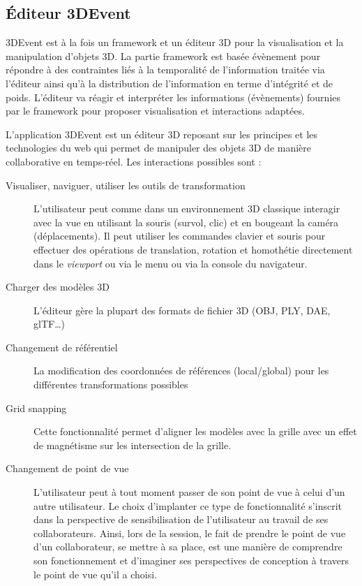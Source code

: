 \subsection{Éditeur 3DEvent}
3DEvent est à la fois un \gls{framework} et un éditeur 3D pour la visualisation et la 
manipulation d'objets 3D. La partie \gls{framework} est basée évènement pour 
répondre à des contraintes liés à la temporalité de l'information traitée via l'éditeur 
ainsi qu'à la distribution de l'information en terme d'intégrité et de poids. L'éditeur 
va réagir et interpréter les informations (évènements) fournies par le 
\gls{framework} pour proposer visualisation et interactions adaptées.

 L'application 3DEvent est un 
éditeur 3D reposant sur les principes et les technologies du web qui permet de 
manipuler des objets 3D de manière 
collaborative en temps-réel. Les interactions possibles sont : 
\begin{description}
	
	\item[Visualiser, naviguer, utiliser les outils de transformation] L'utilisateur peut 
	com\-me dans un environnement 3D classique interagir avec la vue en utilisant 
	la souris (survol, clic) et en bougeant la caméra (déplacements). Il peut 
	utiliser les commandes clavier et souris pour effectuer des opérations de 
	translation, rotation et homothétie directement dans le \textit{viewport} ou via le 
	menu ou via la console du navigateur.
	\item[Charger des modèles 3D] L'éditeur gère la plupart des formats de fichier 
	3D (OBJ, PLY, DAE, glTF\ldots)
	\item[Changement de référentiel] La modification des coordonnées de 
	réfé\-ren\-ces (local/global)  pour les différentes transformations possibles
	\item[Grid snapping] Cette fonctionnalité permet d'aligner les modèles avec la 
	grille avec un effet de magnétisme sur les intersection de la grille.
	\item[Changement de point de vue] L'utilisateur peut à tout moment passer de 
	son point de vue à celui d'un autre utilisateur. Le choix d'implanter ce type de 
	fonctionnalité s'inscrit dans la perspective de sensibilisation de l'utilisateur au 
	travail de ses collaborateurs. Ainsi, lors de la session, le fait de prendre le 
	point de vue d'un collaborateur, se mettre à sa place, est une manière de 
	comprendre son fonctionnement et d'imaginer ses 
	perspectives de conception à travers le point de vue qu'il a choisi.
\end{description}

